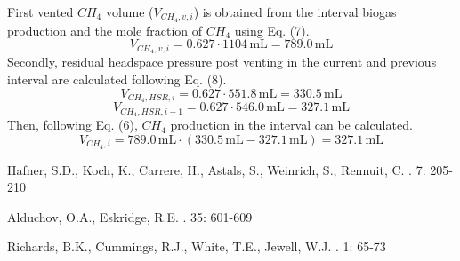 \documentclass[]{article}
\newcommand{\unit}[1]{\ensuremath{\, \mathrm{#1}}}
\begin{document}
First vented $CH_{4}$ volume ($V_{CH_4, v,i}$) is obtained from the interval biogas production and the mole fraction of $CH_{4}$ using Eq. (7).
\begin{equation*}
  V_{CH_4, v, i} = 0.627 \cdot 1104\unit{mL}  = 789.0\unit{mL} 
\end{equation*}
Secondly, residual headspace pressure post venting in the current and previous interval are calculated following Eq. (8).
\begin{equation*}
  V_{CH_4, HSR, i} = 0.627 \cdot 551.8\unit{mL}  = 330.5\unit{mL} 
\end{equation*}
\begin{equation*}
  V_{CH_4, HSR, i-1} = 0.627 \cdot 546.0\unit{mL}  = 327.1\unit{mL} 
\end{equation*}
Then, following Eq. (6), $CH_{4}$ production in the interval can be calculated.
\begin{equation*}
  V_{CH_{4},i} = 789.0\unit{mL} \cdot (330.5\unit{mL} - 327.1\unit{mL})  = 327.1\unit{mL} 
\end{equation*}

\begin{thebibliography}{1}

Hafner, S.D., Koch, K., Carrere, H., Astals, S., Weinrich, S., Rennuit, C.
    . 
     7: 205-210

Alduchov, O.A., Eskridge, R.E.    
    . 
     35: 601-609

Richards, B.K., Cummings, R.J., White, T.E., Jewell, W.J.    
    . 
     1: 65-73

\end{thebibliography}


%
\end{document}
